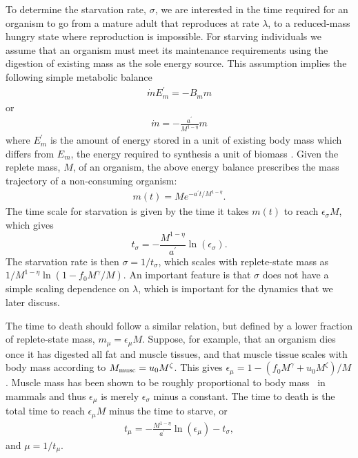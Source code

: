 \documentclass{pnastwo}
\begin{document}
\begin{article}
To determine the starvation rate, $\sigma$, we are interested in the time
required for an organism to go from a mature adult that reproduces at rate
$\lambda$, to a
reduced-mass hungry state where reproduction is impossible.  For starving individuals we assume that an organism must meet its maintenance requirements using the digestion of existing mass as the sole energy source.
This assumption implies the following simple metabolic balance 
\begin{eqnarray}
\dot{m}E_{m}^{\prime}=-B_{m}m
\end{eqnarray}
or
\begin{eqnarray}
\dot{m}=-\frac{a^{\prime}}{M^{1-\eta}}m
\end{eqnarray}
where $E_{m}^{\prime}$ is the amount of energy stored in a unit of existing
body mass which differs from $E_{m}$, the energy required to
synthesis a unit of biomass \cite{hou}. Given the replete mass, $M$, of an organism, the
above energy balance prescribes the mass trajectory of a non-consuming
organism:
\begin{eqnarray}
\label{mt}
m\left(t\right)=Me^{-a^{\prime}t/M^{1-\eta}}.
\end{eqnarray}
The time scale for starvation is
given by the time it takes $m(t)$ to reach $\epsilon_{\sigma} M$, which gives
\begin{equation}
\label{eq:sigma}
t_{\sigma}=-\frac{M^{1-\eta}}{a^{\prime}}\ln\left(\epsilon_{\sigma}\right).
\end{equation}
The starvation rate is then $\sigma=1/t_{\sigma}$, which scales with
replete-state mass as $1/M^{1-\eta}\ln\left(1-f_{0}M^{\gamma}/M\right)$.  An important
feature is that $\sigma$ does not have a simple scaling dependence on
$\lambda$, which is important for the dynamics that we
later discuss.

The time to death should follow a similar relation, but defined by a lower
fraction of replete-state mass, $m_{\mu}=\epsilon_{\mu} M$.
Suppose, for example, that an organism dies once it has digested all fat and
muscle tissues, and that muscle tissue scales with body mass according to
$M_{\rm musc}=u_{0}M^{\zeta}$.  This gives
$\epsilon_{\mu}=1-\left(f_{0}M^{\gamma}+u_{0}M^{\zeta}\right)/M$. Muscle
mass has been shown to be roughly proportional to body mass~\cite{Folland:2008ij} in
mammals and thus $\epsilon_{\mu}$ is merely $\epsilon_{\sigma}$ minus a constant. The time to death is the total time to reach $\epsilon_{\mu}M$ minus the time to starve, or
\begin{eqnarray}
t_{\mu}=-\frac{M^{1-\eta}}{a^{\prime}}\ln\left(\epsilon_{\mu}\right)-t_{\sigma},
\end{eqnarray}
and $\mu=1/t_{\mu}$. 


\end{article}
\end{document}
